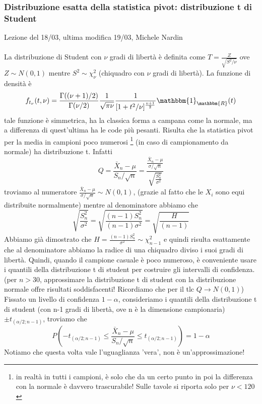 
\subsubsection{Distribuzione esatta della statistica pivot: distribuzione t di Student}

Lezione del 18/03, ultima modifica 19/03, Michele Nardin
\\
\\
La distribuzione di Student con $\nu$ gradi di libertà è definita come 
$T=\frac{Z}{\sqrt{S^2 / \nu}}$ ove $Z \sim N(0,1)$ mentre $S^2 \sim \chi^2_\nu$ (chiquadro con $\nu$ gradi di libertà).
La funzione di densità è $$f_{t_\nu}(t,\nu)=\frac{\Gamma((\nu + 1)/2)}{\Gamma(\nu / 2)}
\frac{1}{\sqrt{\pi \nu}} \frac{1}{[1+t^2/\nu]^{\frac{v+1}{2}}} \mathbbm{1}_\mathbbm{R} (t)$$
tale funzione è simmetrica, ha la classica forma a campana come la normale, ma a differenza di quest'ultima ha le code più pesanti.
Risulta che la statistica pivot per la media in campioni poco numerosi 
\footnote{in realtà in tutti i campioni, è solo che da un certo punto in poi la differenza con la normale è davvero trascurabile! Sulle tavole si riporta solo per $\nu < 120$} (in caso di campionamento da normale) 
ha distribuzione t. Infatti 
$$Q=\frac{\bar{X}_n - \mu}{S_n / \sqrt{n}}=\frac{\frac{\bar{X}_n - \mu}{\sigma / \sqrt{n}}}{\sqrt{\frac{S^2_n}{\sigma^2}}}$$
troviamo al numeratore $\frac{\bar{X}_n - \mu}{\sigma / \sqrt{n}} \sim N(0,1)$, (grazie al fatto che le $X_i$ sono equi distribuite normalmente) 
mentre al denominatore abbiamo che 
$$\sqrt{\frac{S^2_n}{\sigma^2}}= \sqrt{\frac{(n-1)S^2_n}{(n-1) \sigma^2}}= \sqrt{\frac{H}{(n-1)}} $$
Abbiamo già dimostrato che $H=\frac{(n-1)S^2_n}{\sigma^2} \sim \chi^2_{n-1}$ e quindi risulta esattamente che al denominatore abbiamo la radice di una chiquadro diviso i suoi gradi di libertà.
Quindi, quando il campione casuale è poco numeroso, è conveniente usare i quantili della distribuzione t di student per costruire gli intervalli di confidenza. (per $n>30$, approssimare la distribuzione t di student con la distribuzione normale offre risultati soddisfacenti! Ricordiamo che per il tlc $Q\rightarrow N(0,1)$)
Fissato un livello di confidenza $1-\alpha$, consideriamo i quantili della distribuzione t di student 
(con n-1 gradi di libertà, ove n è la dimensione campionaria) 
$\pm t_{(\alpha/2;n-1)}$, 
troviamo che $$ P\left(-t_{(\alpha/2;n-1)} \leq \frac{\bar{X}_n - \mu}{S_n / \sqrt{n}}
 \leq t_{(\alpha/2;n-1)}\right) = 1 - \alpha $$
Notiamo che questa volta vale l'uguaglianza 'vera', non è un'approssimazione! 
